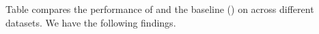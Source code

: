 




Table compares the performance of \attack and the baseline  (\prag) on \rag across different datasets. We have the following findings. 

